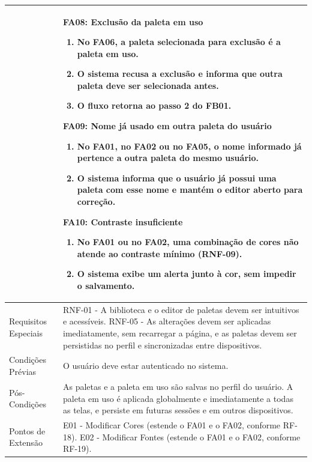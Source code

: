 \begin{longtable}{ >{\raggedright}p{2.8cm} | >{\raggedright\arraybackslash}p{10.7cm} }
 & \mbox{}
\textbf{FA08:} Exclusão da paleta em uso
\vspace{2pt}
\begin{enumerate}[nosep,leftmargin=1.2em,topsep=0pt,partopsep=0pt,parsep=0pt,itemsep=0pt,after=\vspace{2pt}]
    \item No FA06, a paleta selecionada para exclusão é a paleta em uso.
    \item O sistema recusa a exclusão e informa que outra paleta deve ser selecionada antes.
    \item O fluxo retorna ao passo 2 do FB01.
\end{enumerate}

\textbf{FA09:} Nome já usado em outra paleta do usuário
\vspace{2pt}
\begin{enumerate}[nosep,leftmargin=1.2em,topsep=0pt,partopsep=0pt,parsep=0pt,itemsep=0pt,after=\vspace{2pt}]
    \item No FA01, no FA02 ou no FA05, o nome informado já pertence a outra paleta do mesmo usuário.
    \item O sistema informa que o usuário já possui uma paleta com esse nome e mantém o editor aberto para correção.
\end{enumerate}

\textbf{FA10:} Contraste insuficiente
\vspace{2pt}
\begin{enumerate}[nosep,leftmargin=1.2em,topsep=0pt,partopsep=0pt,parsep=0pt,itemsep=0pt,after=\vspace{2pt}]
    \item No FA01 ou no FA02, uma combinação de cores não atende ao contraste mínimo (RNF-09).
    \item O sistema exibe um alerta junto à cor, sem impedir o salvamento.
\end{enumerate}
\mbox{} \\ \hline

Requisitos Especiais & RNF-01 - A biblioteca e o editor de paletas devem ser intuitivos e acessíveis. RNF-05 - As alterações devem ser aplicadas imediatamente, sem recarregar a página, e as paletas devem ser persistidas no perfil e sincronizadas entre dispositivos. \\ \hline

Condições Prévias & O usuário deve estar autenticado no sistema. \\ \hline

Pós-Condições & As paletas e a paleta em uso são salvas no perfil do usuário. A paleta em uso é aplicada globalmente e imediatamente a todas as telas, e persiste em futuras sessões e em outros dispositivos. \\ \hline

Pontos de Extensão &
E01 - Modificar Cores (estende o FA01 e o FA02, conforme RF-18).
E02 - Modificar Fontes (estende o FA01 e o FA02, conforme RF-19). \\
\end{longtable}
\renewcommand{\arraystretch}{1}
\FloatBarrier



